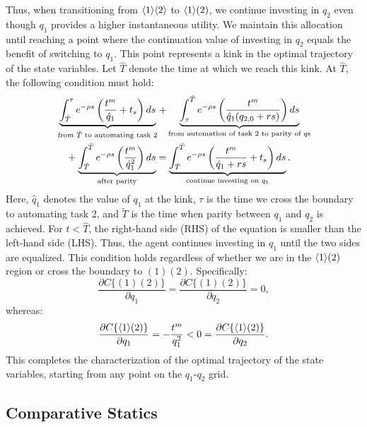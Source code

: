 \documentclass{article}
\theoremstyle{plain}
\theoremstyle{plain}
\begin{document}
Thus, when transitioning from $\langle 1 \rangle\langle 2 \rangle$ to $\langle 1 \rangle( 2 )$, we continue investing in $q_{2}$ even though $q_{1}$ provides a higher instantaneous utility.  
We maintain this allocation until reaching a point where the continuation value of investing in $q_{2}$ equals the benefit of switching to $q_{1}$.  
This point represents a kink in the optimal trajectory of the state variables.  
Let $\hat{T}$ denote the time at which we reach this kink.  
At $\hat{T}$, the following condition must hold:
\begin{equation}
\begin{split}
    & \underbrace{\int_{\hat{T}}^{\tau} e^{-\rho s} \left(\frac{t^{m}_{}}{\hat{q}_{1}} + t_{s}\right) ds}_{\text{from $\hat{T}$ to automating task 2}} 
    + \underbrace{\int_{\tau}^{\tilde{T}} e^{-\rho s} \left(\frac{t^{m}_{}}{\hat{q}_{1}(q_{2,0} + rs)}\right) ds}_{\text{from automation of task 2 to parity of $q$s}} \\
    & \quad + \underbrace{\int_{\tilde{T}}^{\bar{T}} e^{-\rho s} \left(\frac{t^{m}_{}}{\hat{q}_{1}^{2}}\right) ds}_{\text{after parity}} 
    = \underbrace{\int_{\hat{T}}^{\bar{T}} e^{-\rho s} \left(\frac{t^{m}_{}}{\hat{q}_{1} + rs} + t_{s}\right) ds}_{\text{continue investing on $q_{1}$}}.
\end{split}
\label{eq:kink_eq}
\end{equation}
Here, $\hat{q}_{1}$ denotes the value of $q_{1}$ at the kink, $\tau$ is the time we cross the boundary to automating task 2, and $\tilde{T}$ is the time when parity between $q_{1}$ and $q_{2}$ is achieved.  
For $t<\hat{T}$, the right-hand side (RHS) of the equation is smaller than the left-hand side (LHS).  
Thus, the agent continues investing in $q_{1}$ until the two sides are equalized.  
This condition holds regardless of whether we are in the $\langle 1 \rangle( 2 )$ region or cross the boundary to $(1)(2)$.  
Specifically: 
\[
\frac{\partial C\{(1)(2)\}}{\partial q_{1}}=\frac{\partial C\{(1)(2)\}}{\partial q_{2}}=0,
\]
whereas:
\[
\frac{\partial C\{\langle 1 \rangle( 2 )\}}{\partial q_{1}}=-\frac{t^{m}_{}}{q_{1}^{2}}<0=\frac{\partial C\{\langle 1 \rangle( 2 )\}}{\partial q_{2}}.
\]
This completes the characterization of the optimal trajectory of the state variables, starting from any point on the $q_{1}$-$q_{2}$ grid.

\subsection{Comparative Statics}
\end{document}
